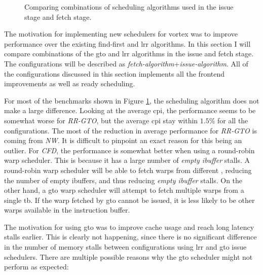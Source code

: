 \begin{figure}
    \centering
    \caption[Normalized \acrshort{cpi} stacks comparing schedulers.]{Comparing combinations of scheduling algorithms used in the issue stage and fetch stage.}
    \label{fig:cpi_norm_schedulers}
\end{figure}

The motivation for implementing new schedulers for \Gls{vortex} was to improve performance over the existing find-first and \acrshort{lrr} algorithms. In this section I will compare combinations of the \acrshort{gto} and \acrshort{lrr} algorithms in the issue and fetch stage. The configurations will be described as \textit{fetch-algorithm}+\textit{issue-algorithm}. All of the configurations discussed in this section implements all the frontend improvements as well as ready scheduling.

For most of the benchmarks shown in Figure \ref{fig:cpi_norm_schedulers}, the scheduling algorithm does not make a large difference. Looking at the average \acrshort{cpi}, the performance seems to be somewhat worse for \textit{RR-GTO}, but the average \acrshort{cpi} stay within $1.5\%$ for all the configurations. The most of the reduction in average performance for \textit{RR-GTO} is coming from \textit{NW}. It is difficult to pinpoint an exact reason for this being an outlier. For \textit{CFD}, the performance is somewhat better when using a round-robin warp scheduler. This is because it has a large number of \textit{empty ibuffer} stalls. A round-robin warp scheduler will be able to fetch warps from different , reducing the number of empty ibuffers, and thus reducing \textit{empty ibuffer} stalls. On the other hand, a \acrshort{gto} warp scheduler will attempt to fetch multiple warps from a single \acrshort{tb}. If the warp fetched by \acrshort{gto} cannot be issued, it is less likely to be other warps available in the instruction buffer.

The motivation for using \acrshort{gto} was to improve cache usage and reach long latency stalls earlier. This is clearly not happening, since there is no significant difference in the number of memory stalls between configurations using \acrshort{lrr} and \acrshort{gto} issue schedulers. There are multiple possible reasons why the \acrshort{gto} scheduler might not perform as expected:

